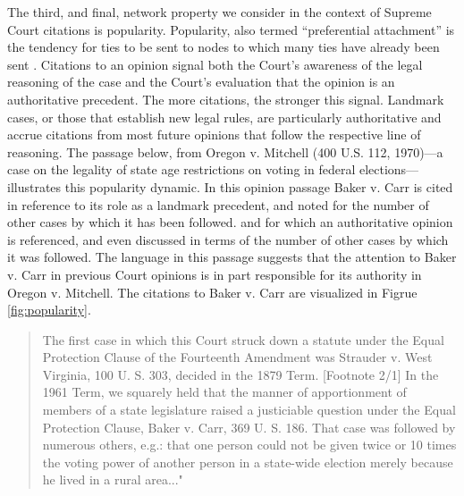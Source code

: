 \documentclass[headsepline=true, abstracton]{scrartcl}
\begin{document}
The third, and final, network property we consider in the context of Supreme Court citations is popularity. Popularity, also termed ``preferential attachment'' is the tendency for ties to be sent to nodes to which many ties have already been sent \citep{barabasi1999emergence}. Citations to an opinion signal both the Court's awareness of the legal reasoning of the case and the Court's evaluation that the opinion is an authoritative precedent. The more citations, the stronger this signal. Landmark cases, or those that establish new legal rules, are particularly authoritative and accrue citations from most future opinions that follow the respective line of reasoning. The passage below, from Oregon v. Mitchell (400 U.S. 112, 1970)---a case on the legality of state age restrictions on voting in federal elections---illustrates this popularity dynamic. In this opinion passage Baker v. Carr is cited in reference to its role as a landmark precedent, and noted for the number of other cases by which it has been followed. and for which an authoritative opinion is referenced, and even discussed in terms of the number of other cases by which it was followed. The language in this passage suggests that the attention to Baker v. Carr in previous Court opinions is in part responsible for its authority in Oregon v. Mitchell. The citations to Baker v. Carr are visualized in Figrue \ref{fig:popularity}.
\begin{quotation}
The first case in which this Court struck down a statute under the Equal Protection Clause of the Fourteenth Amendment was Strauder v. West Virginia, 100 U. S. 303, decided in the 1879 Term. [Footnote 2/1] In the 1961 Term, we squarely held that the manner of apportionment of members of a state legislature raised a justiciable question under the Equal Protection Clause, Baker v. Carr, 369 U. S. 186. That case was followed by numerous others, e.g.: that one person could not be given twice or 10 times the voting power of another person in a state-wide election merely because he lived in a rural area..."
\end{quotation} %
\end{document}
